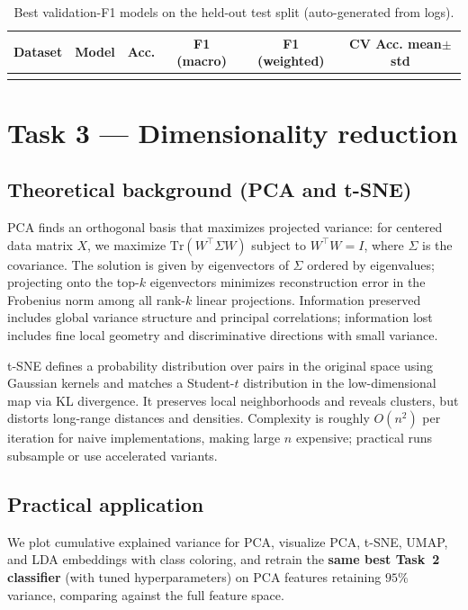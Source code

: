 \documentclass[11pt,a4paper]{article}
\begin{document}
\begin{table}[htbp]
\centering
\caption{Best validation-F1 models on the held-out test split (auto-generated from logs).}
\label{tab:task2-results}
\begin{tabular}{@{}llcccc@{}}
\toprule
Dataset & Model & Acc. & F1 (macro) & F1 (weighted) & CV Acc. mean$\pm$std \\
\midrule
 \\
\bottomrule
\end{tabular}
\end{table}

\newpage
\section{Task 3 --- Dimensionality reduction}

\subsection{Theoretical background (PCA and t-SNE)}
PCA finds an orthogonal basis that maximizes projected variance: for centered data matrix $X$, we maximize $\mathrm{Tr}(W^\top \Sigma W)$ subject to $W^\top W = I$, where $\Sigma$ is the covariance. The solution is given by eigenvectors of $\Sigma$ ordered by eigenvalues; projecting onto the top-$k$ eigenvectors minimizes reconstruction error in the Frobenius norm among all rank-$k$ linear projections. Information preserved includes global variance structure and principal correlations; information lost includes fine local geometry and discriminative directions with small variance.

t-SNE defines a probability distribution over pairs in the original space using Gaussian kernels and matches a Student-$t$ distribution in the low-dimensional map via KL divergence. It preserves local neighborhoods and reveals clusters, but distorts long-range distances and densities. Complexity is roughly $O(n^2)$ per iteration for naive implementations, making large $n$ expensive; practical runs subsample or use accelerated variants.

\subsection{Practical application}
We plot cumulative explained variance for PCA, visualize PCA, t-SNE, UMAP, and LDA embeddings with class coloring, and retrain the \textbf{same best Task~2 classifier} (with tuned hyperparameters) on PCA features retaining $95\%$ variance, comparing against the full feature space.
\end{document}
